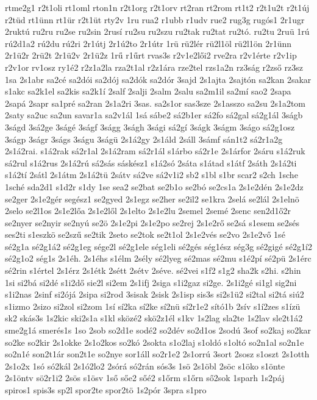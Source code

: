 {rtme2g1
r2t1oli
rt1oml
rton1n
r2t1org
r2t1orv
rt2ran
rt2rom
rt1t2
r2t1u2t
r2t1új
r2tüd
rt1ünn
rt1ür
r2t1üt
rty2v
1ru
rua2
r1ubb
r1udv
rue2
rug3g
rugós1
2r1ugr
2ruktú
ru2ru
ru2se
ru2sin
2rusí
ru2su
ru2szu
ru2tak
ru2tat
ru2tó.
ru2tu
2ruü
1rú
rú2d1a2
rú2du
rú2ri
2r1útj
2r1ú2to
2r1útr
1rü
rü2lér
rü2l1öl
rü2l1ön
2r1ünn
2r1ü2r
2rü2t
2r1ü2v
2r1ü2z
1rű
r1űrt
rvas3s
r2v1e2lői2
rve2ra
r2v1érte
r2v1ip
r2v1or
rv1osz
ry1é2
r2z1a2la
rza2t1al
r2z1ára
rze2tel
rzs1a2n
rz3ság
r2zső
rz3sz
1sa
2s1abr
sa2cé
sa2dói
sa2dój
sa2dók
sa2dór
3sajd
2s1ajta
2sajtón
sa2kan
2sakar
s1akc
sa2k1el
sa2kis
sa2k1í
2salf
2salji
2salm
2salu
sa2m1il
sa2mí
sao2
2sapa
2sapá
2sapr
sa1pré
sa2ran
2s1a2ri
3sas.
sa2s1or
sas3sze
2s1asszo
sa2su
2s1a2tom
2saty
sa2uc
sa2un
savar1a
sa2v1ál
1sá
sábe2
sá2b1er
sá2fo
sá2gal
sá2g1ál
3ságb
3ságd
3sá2ge
3ságé
3ságf
3ságg
3ságh
3sági
sá2gí
3ságk
3ságm
3ságo
sá2g1osz
3ságp
3ságr
3ságs
3ságu
3ságü
2s1á2gy
2s1áld
2sáll
3sámf
sán1t2
sá2r1a2g
2s1á2rai.
s1á2rak
sá2r1al
2s1á2ram
sá2r1ál
s1árbo
sá2r1e
2s1árfor
2sáru
s1á2ruk
sá2rul
s1á2rus
2s1á2rú
sá2sás
sáskész1
s1á2só
2sáta
s1átad
s1átf
2sáth
2s1á2ti
s1á2tí
2sátl
2s1átm
2s1á2tü
2sátv
sá2ve
sá2v1i2
sb2
s1bl
s1br
scar2
s2ch
1sche
1sché
sda2d1
s1d2r
s1dy
1se
sea2
se2bat
se2b1o
se2bó
se2cs1a
2s1e2dén
2s1e2dz
se2ger
2s1e2gér
segész1
se2gyed
2s1egz
se2her
se2il2
se1kra
2selá
se2lál
2s1elnö
2selo
se2l1os
2s1e2lőa
2s1e2lől
2s1elto
2s1e2lu
2semel
2semé
2senc
sen2d1ő2r
se2nyer
se2nyir
se2nyú
se2ö
2s1e2pi
2s1e2po
se2rej
2s1e2rő
se2sá
s1esem
se2sés
ses2ti
s1eszkö
se2szű
se2tik
2seto
se2tok
se2t1ol
2s1e2vés
se2vo
2s1e2vő
1sé
sé2g1a
sé2g1á2
sé2g1eg
sége2l
sé2g1ele
ség1eli
sé2gés
ség1ész
ség3g
sé2gigé
sé2g1í2
sé2g1o2
ség1s
2s1éh.
2s1éhs
s1élm
2sély
sé2lyeg
sé2mas
sé2mu
s1é2pí
sé2pü
2s1érc
sé2rin
s1értel
2s1érz
2s1étk
2sétt
2sétv
2séve.
sé2vei
s1f2
s1g2
sha2k
s2hi.
s2hin
1si
si2bá
si2dé
s1i2dő
sie2l
si2em
2s1ifj
2siga
s1i2gaz
si2ge.
2s1i2gé
si1gl
sig2ni
s1i2nas
2sinf
si2ójá
2sipa
si2rod
3sisak
2sisk
2s1isp
sis3s
si2s1ü2
si2tal
si2tá
siú2
s1izmo
2sizo
si2zol
si2zom
1sí
sí2ka
sí2ke
sí2nü
sí2r1e2
sító1b
2sív
s1í2zes
s1ízü
sk2
skás3s
1s2kic
ski2s1a
s1kl
sközé2
skö2z1él
s1kv
1s2lag
sla2te
1s2lav
sle2t1á2
sme2g1á
smerés1s
1so
2sob
so2d1e
sodé2
so2dév
so2d1os
2sodú
3sof
so2kaj
so2kar
so2ke
so2kir
2s1okke
2s1o2kos
so2kó
2sokta
s1o2laj
s1oldó
s1oltó
so2n1al
so2n1e
so2n1é
son2t1ár
son2t1e
so2nye
sor1áll
so2r1e2
2s1orrú
3sort
2sosz
s1oszt
2s1otth
2s1o2x
1só
só2kál
2s1ó2lo2
2sórá
só2rán
sós3s
1sö
2s1öbl
2söc
s1öko
s1önte
2s1öntv
sö2r1i2
2sös
s1ösv
1ső
sőe2
sőé2
s1őrm
s1őrn
ső2sok
1sparh
1s2páj
spiros1
spis3s
sp2l
spor2te
spor2tö
1s2pór
3spra
s1pro
}
